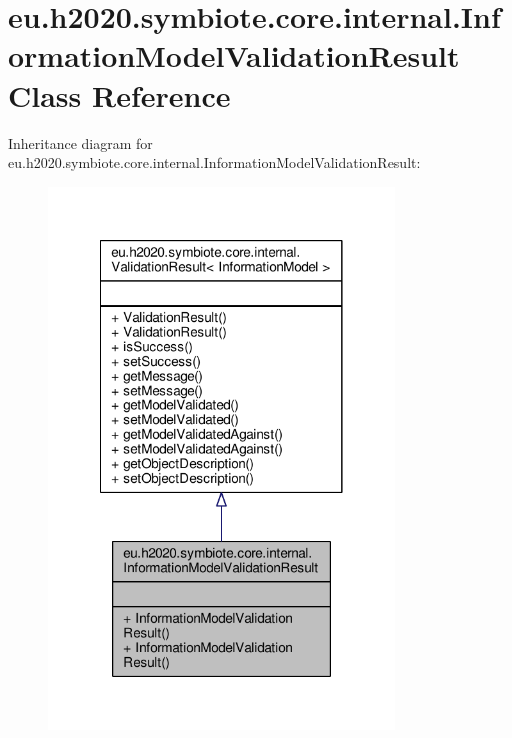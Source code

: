 \hypertarget{classeu_1_1h2020_1_1symbiote_1_1core_1_1internal_1_1InformationModelValidationResult}{}\section{eu.\+h2020.\+symbiote.\+core.\+internal.\+Information\+Model\+Validation\+Result Class Reference}
\label{classeu_1_1h2020_1_1symbiote_1_1core_1_1internal_1_1InformationModelValidationResult}


Inheritance diagram for eu.\+h2020.\+symbiote.\+core.\+internal.\+Information\+Model\+Validation\+Result\+:
\nopagebreak
\begin{figure}[H]
\begin{center}
\leavevmode
\includegraphics[width=260pt]{classeu_1_1h2020_1_1symbiote_1_1core_1_1internal_1_1InformationModelValidationResult__inherit__graph}
\end{center}
\end{figure}


